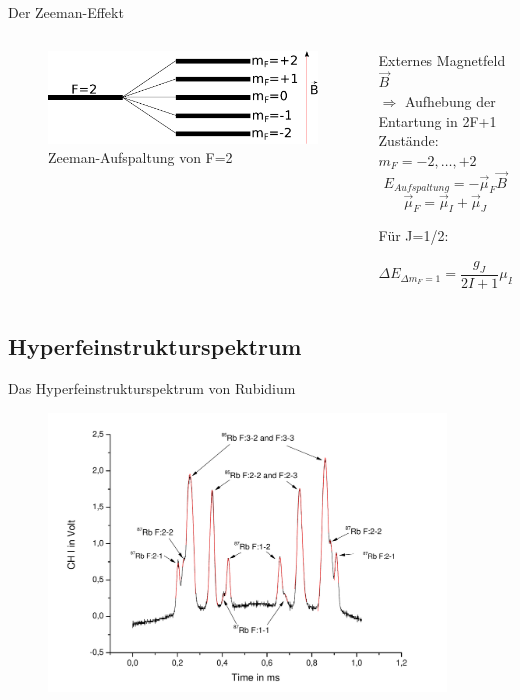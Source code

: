 \documentclass{beamer}
\begin{document}
\begin{frame}{Der Zeeman-Effekt}
\begin{columns}
\begin{column}{4.5cm}
	\begin{figure}[H]
	\centering \includegraphics[width=\textwidth]{Bilder/Zeeman.pdf}
	\caption{Zeeman-Aufspaltung von F=2}
	\end{figure}
\end{column}
\begin{column}{5.5cm}
Externes Magnetfeld $\vec B$ \\ $\Rightarrow$ Aufhebung der Entartung in 2F+1 Zustände: $m_F = -2,\dots,+2$
$$E_{Aufspaltung} = - \vec\mu_F\vec B$$ 
$$\vec\mu_F = \vec\mu_I + \vec \mu_J$$

Für J=1/2:

$$\Delta E_{\Delta m_F=1} = \frac{g_J}{2I+1}\mu_B B$$
\end{column}
\end{columns}
\end{frame}


\subsection{Hyperfeinstrukturspektrum}
\begin{frame}{Das Hyperfeinstrukturspektrum von Rubidium}
	\begin{figure}[H]
	\centering \includegraphics[width=0.94\textwidth]{Bilder/HFS.pdf}
	\end{figure}
\end{frame}
\end{document}
